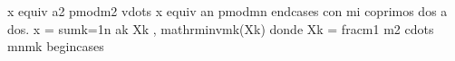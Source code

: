 {}x \markdownRendererBackslash{}equiv a\markdownRendererUnderscore{}2 \markdownRendererBackslash{}pmod\markdownRendererLeftBrace{}m\markdownRendererUnderscore{}2\markdownRendererRightBrace{} \markdownRendererBackslash{}\markdownRendererBackslash{}\markdownRendererSoftLineBreak
{}\markdownRendererBackslash{}vdots \markdownRendererBackslash{}\markdownRendererBackslash{}\markdownRendererSoftLineBreak
{}x \markdownRendererBackslash{}equiv a\markdownRendererUnderscore{}n \markdownRendererBackslash{}pmod\markdownRendererLeftBrace{}m\markdownRendererUnderscore{}n\markdownRendererRightBrace{}\markdownRendererSoftLineBreak
{}\markdownRendererBackslash{}end\markdownRendererLeftBrace{}cases\markdownRendererRightBrace{}\markdownRendererSoftLineBreak
{}\markdownRendererDollarSign{}\markdownRendererDollarSign{}\markdownRendererParagraphSeparator
{}con \markdownRendererDollarSign{}m\markdownRendererUnderscore{}i\markdownRendererDollarSign{} coprimos dos a dos.\markdownRendererParagraphSeparator
{}\markdownRendererParagraphSeparator
{}\markdownRendererDollarSign{}\markdownRendererDollarSign{}\markdownRendererSoftLineBreak
{}x = \markdownRendererBackslash{}sum\markdownRendererUnderscore{}\markdownRendererLeftBrace{}k=1\markdownRendererRightBrace{}\markdownRendererCircumflex{}\markdownRendererLeftBrace{}n\markdownRendererRightBrace{} a\markdownRendererUnderscore{}k X\markdownRendererUnderscore{}k , \markdownRendererBackslash{}mathrm\markdownRendererLeftBrace{}inv\markdownRendererRightBrace{}\markdownRendererUnderscore{}\markdownRendererLeftBrace{}m\markdownRendererUnderscore{}k\markdownRendererRightBrace{}(X\markdownRendererUnderscore{}k)\markdownRendererSoftLineBreak
{}\markdownRendererDollarSign{}\markdownRendererDollarSign{}\markdownRendererParagraphSeparator
{}donde\markdownRendererParagraphSeparator
{}\markdownRendererDollarSign{}\markdownRendererDollarSign{}\markdownRendererSoftLineBreak
{}X\markdownRendererUnderscore{}k = \markdownRendererBackslash{}frac\markdownRendererLeftBrace{}m\markdownRendererUnderscore{}1 m\markdownRendererUnderscore{}2 \markdownRendererBackslash{}cdots m\markdownRendererUnderscore{}n\markdownRendererRightBrace{}\markdownRendererLeftBrace{}m\markdownRendererUnderscore{}k\markdownRendererRightBrace{}\markdownRendererSoftLineBreak
{}\markdownRendererDollarSign{}\markdownRendererDollarSign{}\markdownRendererParagraphSeparator
{}\markdownRendererParagraphSeparator
{}\markdownRendererDollarSign{}\markdownRendererDollarSign{}\markdownRendererSoftLineBreak
{}\markdownRendererBackslash{}begin\markdownRendererLeftBrace{}cases\markdownRendererRightBrace{}\markdownRendererSoftLineBreak
